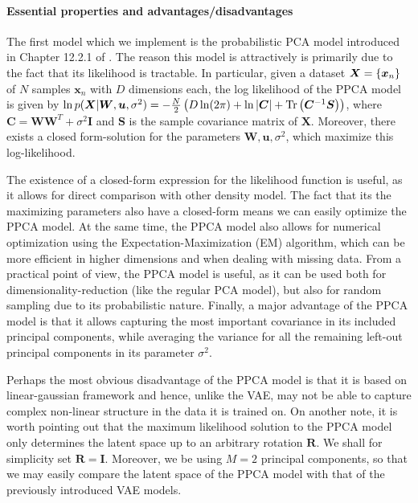 \paragraph{Essential properties and advantages/disadvantages}
The first model which we implement is the probabilistic PCA model introduced in Chapter 12.2.1 of \citep{bishop2006pattern}. The reason this model is attractively is primarily due to the fact that its likelihood is tractable. In particular, given a dataset $\bm{X} = \left \{\bm{x}_n\right\}$ of $N$ samples $\bm{x}_n$ with $D$ dimensions each, the log likelihood of the PPCA model is given by $\ln p(\bm{X}|\bm{W}, \bm{u}, \sigma^2) = -\frac{N}{2}\left (D \ln(2\pi) + \ln \left |\bm{C}\right| + \text{Tr}\left (\bm{C}^{-1}\bm{S}\right)\right)$, where $\bm{C} = \bm{W}\bm{W}^T + \sigma^2 \bm{I}$ and $\bm{S}$ is the sample covariance matrix of $\bm{X}$. Moreover, there exists a closed form-solution for the parameters $\bm{W}, \bm{u}, \sigma^2$, which maximize this log-likelihood. 

The existence of a closed-form expression for the likelihood function is useful, as it allows for direct comparison with other density model. The fact that its the maximizing parameters also have a closed-form means we can easily optimize the PPCA model. At the same time, the PPCA model also allows for numerical optimization using the Expectation-Maximization (EM) algorithm, which can be more efficient in higher dimensions and when dealing with missing data. From a practical point of view, the PPCA model is useful, as it can be used both for dimensionality-reduction (like the regular PCA model), but also for random sampling due to its probabilistic nature. Finally, a major advantage of the PPCA model is that it allows capturing the most important covariance in its included principal components, while averaging the variance for all the remaining left-out principal components in its parameter $\sigma^2$. 

Perhaps the most obvious disadvantage of the PPCA model is that it is based on linear-gaussian framework and hence, unlike the VAE, may not be able to capture complex non-linear structure in the data it is trained on. On another note, it is worth pointing out that the maximum likelihood solution to the PPCA model only determines the latent space up to an arbitrary rotation $\bm{R}$. We shall for simplicity set $\bm{R} = \bm{I}$. Moreover, we be using $M=2$ principal components, so that we may easily compare the latent space of the PPCA model with that of the previously introduced VAE models.